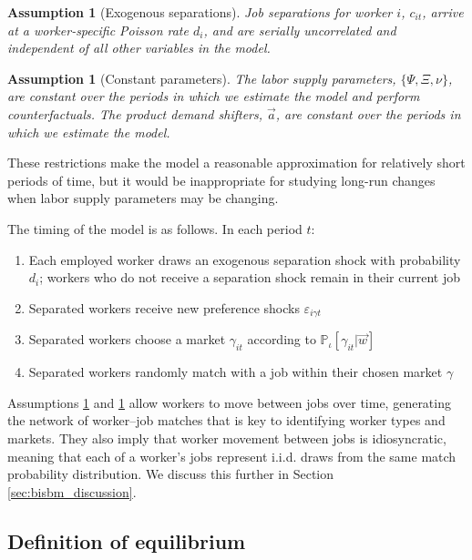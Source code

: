 \documentclass[12pt]{article}
\def\g{\gamma}
\def\i{\iota}
\renewcommand{\P}{\mathbb {P}}
\theoremstyle{definition}
\theoremstyle{plain}
\newtheorem{assumption}[theorem]{Assumption}
\def\ve{\varepsilon}
\begin{document}
\begin{assumption}[Exogenous separations]
	\label{ass:mobility}
	Job separations for worker $i$, $c_{it}$, arrive at a worker-specific Poisson rate $d_i$, and are serially uncorrelated and independent of all other variables in the model. 
\end{assumption}

\begin{assumption}[Constant parameters]
	\label{ass:constant_parameters}
	The labor supply parameters, $\{\Psi, \Xi, \nu\}$, are constant over the periods in which we estimate the model and perform counterfactuals. The product demand shifters, $\vec{a}$, are constant over the periods in which we estimate the model.
\end{assumption}

These restrictions make the model a reasonable approximation for relatively short periods of time, but it would be inappropriate for studying long-run changes when labor supply parameters may be changing.


The timing of the model is as follows. In each period $t$:
\begin{enumerate}
	\item Each employed worker draws an exogenous separation shock with probability $d_i$; workers who do not receive a separation shock remain in their current job
	\item Separated workers receive new preference shocks $\ve_{i\g t}$
	\item Separated workers choose a market $\g_{it}$ according to $\P_{\i}[\g_{it} |  \vec{w}]$
	\item Separated workers randomly match with a job within their chosen market $\g$
\end{enumerate}

Assumptions \ref{ass:mobility} and \ref{ass:constant_parameters} allow workers to move between jobs over time, generating the network of worker--job matches that is key to identifying worker types and markets. They also imply that worker movement between jobs is idiosyncratic, meaning that each of a worker's jobs represent i.i.d. draws from the same match probability distribution. We discuss this further in Section \ref{sec:bisbm_discussion}.


 
\subsection{Definition of equilibrium}
\end{document}
